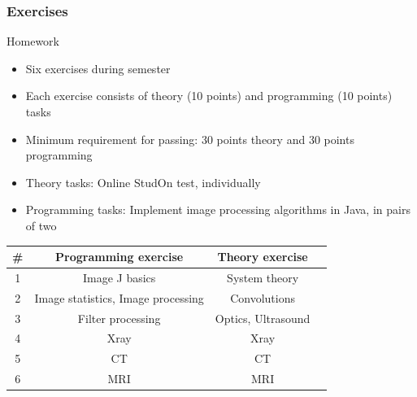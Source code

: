 \begin{frame}
	\frametitle{Exercises}
	\begin{block}{Homework}
		\begin{itemize}
			\item Six exercises during semester
			\item Each exercise consists of theory (10 points) and programming (10 points) tasks
			\item Minimum requirement for passing: 30 points theory and 30 points programming
			\item Theory tasks: Online StudOn test, individually
			\item Programming tasks: Implement image processing algorithms in Java, in pairs of two
		\end{itemize}
		\begin{center}
			\begin{tabular}{c | c | c | c}
				\# & Programming exercise			& Theory exercise \\ \hline
				1  & Image J basics    				& System theory              \\
				2  & Image statistics, Image processing    	& Convolutions                    \\
				3  & Filter processing  				& Optics, Ultrasound           \\
				4  & Xray    						& Xray                	      \\
				5  & CT    							& CT                		     \\
				6  & MRI    						& MRI                	     \\
			\end{tabular}
		\end{center}
	\end{block}
\end{frame}

